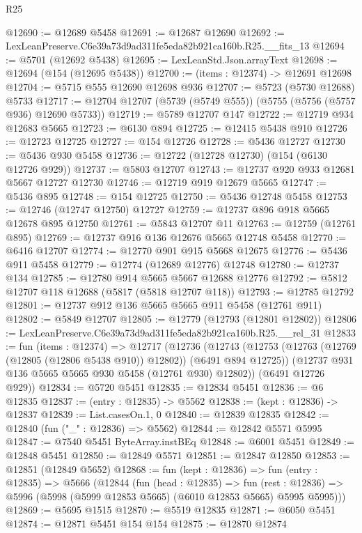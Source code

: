 \begin{lexlean}{R25}
\begin{coremodule}
@12690 := @12689 @5458
@12691 := @12687 @12690
@12692 := LexLeanPreserve.C6e39a73d9ad311fe5eda82b921ca160b.R25.__fits_13
@12694 := @5701 (@12692 @5438)
@12695 := LexLeanStd.Json.arrayText
@12698 := @12694 (@154 (@12695 @5438))
@12700 := (items : @12374) -> @12691 @12698
@12704 := @5715 @555 @12690 @12698 @936
@12707 := @5723 (@5730 @12688) @5733
@12717 := @12704 @12707 (@5739 (@5749 @555)) (@5755 (@5756 (@5757 @936) @12690 @5733))
@12719 := @5789 @12707 @147
@12722 := @12719 @934 @12683 @5665
@12723 := @6130 @894
@12725 := @12415 @5438 @910
@12726 := @12723 @12725
@12727 := @154 @12726
@12728 := @5436 @12727
@12730 := @5436 @930 @5458
@12736 := @12722 (@12728 @12730) (@154 (@6130 @12726 @929))
@12737 := @5803 @12707
@12743 := @12737 @920 @933 @12681 @5667 @12727 @12730
@12746 := @12719 @919 @12679 @5665
@12747 := @5436 @895
@12748 := @154 @12725
@12750 := @5436 @12748 @5458
@12753 := @12746 (@12747 @12750) @12727
@12759 := @12737 @896 @918 @5665 @12678 @895 @12750
@12761 := @5843 @12707 @11
@12763 := @12759 (@12761 @895)
@12769 := @12737 @916 @136 @12676 @5665 @12748 @5458
@12770 := @6416 @12707
@12774 := @12770 @901 @915 @5668 @12675
@12776 := @5436 @911 @5458
@12779 := @12774 (@12689 @12776) @12748
@12780 := @12737 @134
@12785 := @12780 @914 @5665 @5667 @12688 @12776
@12792 := @5812 @12707 @118 @12688 (@5817 (@5818 @12707 @118))
@12793 := @12785 @12792
@12801 := @12737 @912 @136 @5665 @5665 @911 @5458 (@12761 @911)
@12802 := @5849 @12707
@12805 := @12779 (@12793 (@12801 @12802))
@12806 := LexLeanPreserve.C6e39a73d9ad311fe5eda82b921ca160b.R25.__rel_31
@12833 := fun (items : @12374) =>
  @12717
    (@12736
      (@12743
        (@12753 (@12763 (@12769 (@12805 (@12806 @5438 @910)) @12802)) (@6491 @894 @12725))
        (@12737 @931 @136 @5665 @5665 @930 @5458 (@12761 @930) @12802))
      (@6491 @12726 @929))
@12834 := @5720 @5451
@12835 := @12834 @5451
@12836 := @6 @12835
@12837 := (entry : @12835) -> @5562
@12838 := (kept : @12836) -> @12837
@12839 := List.casesOn.{1, 0}
@12840 := @12839 @12835
@12842 := @12840 (fun ("_" : @12836) => @5562)
@12844 := @12842 @5571 @5995
@12847 := @7540 @5451 ByteArray.instBEq
@12848 := @6001 @5451
@12849 := @12848 @5451
@12850 := @12849 @5571
@12851 := @12847 @12850
@12853 := @12851 (@12849 @5652)
@12868 := fun (kept : @12836) =>
  fun (entry : @12835) =>
  @5666
    (@12844
      (fun (head : @12835) =>
      fun (rest : @12836) => @5996 (@5998 (@5999 @12853 @5665) (@6010 @12853 @5665) @5995 @5995)))
@12869 := @5695 @1515
@12870 := @5519 @12835
@12871 := @6050 @5451
@12874 := @12871 @5451 @154 @154
@12875 := @12870 @12874

\end{coremodule}
\end{lexlean}
